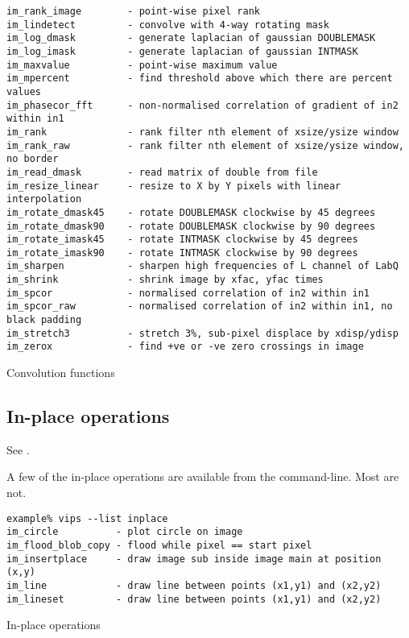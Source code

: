 \begin{fig2}
\begin{verbatim}
im_rank_image        - point-wise pixel rank
im_lindetect         - convolve with 4-way rotating mask
im_log_dmask         - generate laplacian of gaussian DOUBLEMASK
im_log_imask         - generate laplacian of gaussian INTMASK
im_maxvalue          - point-wise maximum value
im_mpercent          - find threshold above which there are percent values
im_phasecor_fft      - non-normalised correlation of gradient of in2 within in1
im_rank              - rank filter nth element of xsize/ysize window
im_rank_raw          - rank filter nth element of xsize/ysize window, no border
im_read_dmask        - read matrix of double from file
im_resize_linear     - resize to X by Y pixels with linear interpolation
im_rotate_dmask45    - rotate DOUBLEMASK clockwise by 45 degrees
im_rotate_dmask90    - rotate DOUBLEMASK clockwise by 90 degrees
im_rotate_imask45    - rotate INTMASK clockwise by 45 degrees
im_rotate_imask90    - rotate INTMASK clockwise by 90 degrees
im_sharpen           - sharpen high frequencies of L channel of LabQ
im_shrink            - shrink image by xfac, yfac times
im_spcor             - normalised correlation of in2 within in1
im_spcor_raw         - normalised correlation of in2 within in1, no black padding
im_stretch3          - stretch 3%, sub-pixel displace by xdisp/ydisp
im_zerox             - find +ve or -ve zero crossings in image
\end{verbatim}
\caption{Convolution functions}
\label{fg:convolution}
\end{fig2}

\subsection{In-place operations}
\label{sec:inplace}

See .

A few of the in-place operations are available from the command-line. Most are
not. 

\begin{fig2}
\begin{verbatim}
example% vips --list inplace
im_circle          - plot circle on image
im_flood_blob_copy - flood while pixel == start pixel
im_insertplace     - draw image sub inside image main at position (x,y)
im_line            - draw line between points (x1,y1) and (x2,y2)
im_lineset         - draw line between points (x1,y1) and (x2,y2)
\end{verbatim}
\caption{In-place operations}
\label{fg:inplace}
\end{fig2}

